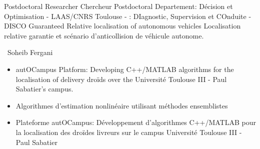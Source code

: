 \cventry{\may\ 2023 \newline \may\ 2024\newline}
{
  \ml
  {Postdoctoral Researcher}
  {}
  {Chercheur Postdoctoral}%
}
{\newline Departement: Décision et Optimisation - LAAS/CNRS}
{\newline Toulouse - \france
\newline{}: DIagnostic, Supervision et COnduite - DISCO}
{\newline
  \ml
  {Guaranteed Relative localisation of autonomous vehicles}
  {}
  {Localisation relative garantie et scénario d'anticollision de véhicule autonome}.
}
{
  \supervisor\ Soheib Fergani
  \ml
  {
    \begin{itemize}
      \item autOCampus Platform: Developing C++/MATLAB algorithms for the localisation of delivery droïds over the Université Toulouse III - Paul Sabatier's campus.
    \end{itemize}
  }
  {}
  {\begin{itemize}
    \item Algorithmes d'estimation nonlinéaire utilisant méthodes ensemblistes
    \item Plateforme autOCampus: Développement d'algorithmes C++/MATLAB pour la localisation des droïdes livreurs sur le campus Université Toulouse III - Paul Sabatier
  \end{itemize}
  }
}

